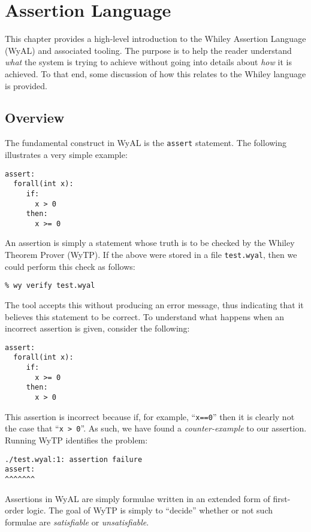 \chapter{Assertion Language}

This chapter provides a high-level introduction to the Whiley
Assertion Language (WyAL) and associated tooling.  The purpose is to
help the reader understand {\em what} the system is trying to achieve
without going into details about {\em how} it is achieved.  To that
end, some discussion of how this relates to the Whiley language is
provided.

\section{Overview}
The fundamental construct in WyAL is the \lstinline{assert} statement.
The following illustrates a very simple example:
\begin{lstlisting}[language=WyAL]
assert:
  forall(int x):
     if:
       x > 0
     then:
       x >= 0
\end{lstlisting}
An assertion is simply a statement whose truth is to be checked by the
Whiley Theorem Prover (WyTP).  If the above were stored in a file
\lstinline{test.wyal}, then we could perform this check as follows:
\begin{verbatim}
% wy verify test.wyal
\end{verbatim}
The tool accepts this without producing an error message, thus
indicating that it believes this statement to be correct.  To
understand what happens when an incorrect assertion is given, consider
the following:
\begin{lstlisting}[language=WyAL]
assert:
  forall(int x):
     if:
       x >= 0
     then:
       x > 0
\end{lstlisting}

This assertion is incorrect because if, for example,
``\lstinline{x==0}'' then it is clearly not the case that
``\lstinline{x > 0}''.  As such, we have found a {\em counter-example}
to our assertion.  Running WyTP identifies the problem:
\begin{lstlisting}
./test.wyal:1: assertion failure
assert:
^^^^^^^
\end{lstlisting}

Assertions in WyAL are simply formulae written in an extended form of
first-order logic.  The goal of WyTP is simply to ``decide'' whether
or not such formulae are {\em satisfiable} or {\em unsatisfiable}.  


